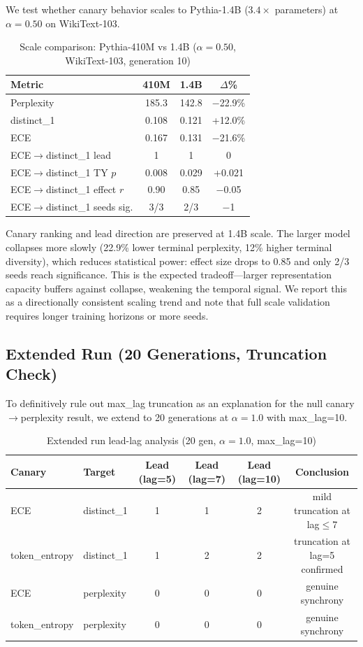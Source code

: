 \documentclass[letterpaper]{article}
\begin{document}
We test whether canary behavior scales to Pythia-1.4B ($3.4\times$ parameters) at $\alpha=0.50$ on WikiText-103.

\begin{table}[h]
\centering
\caption{Scale comparison: Pythia-410M vs 1.4B ($\alpha=0.50$, WikiText-103, generation 10)}
\label{tab:scale}
\begin{tabular}{lccc}
\toprule
Metric & 410M & 1.4B & $\Delta$\% \\
\midrule
Perplexity & 185.3 & 142.8 & $-$22.9\% \\
distinct\_1 & 0.108 & 0.121 & +12.0\% \\
ECE & 0.167 & 0.131 & $-$21.6\% \\
ECE$\to$distinct\_1 lead & 1 & 1 & 0 \\
ECE$\to$distinct\_1 TY $p$ & 0.008 & 0.029 & +0.021 \\
ECE$\to$distinct\_1 effect $r$ & 0.90 & 0.85 & $-$0.05 \\
ECE$\to$distinct\_1 seeds sig. & 3/3 & 2/3 & $-$1 \\
\bottomrule
\end{tabular}
\end{table}

Canary ranking and lead direction are preserved at 1.4B scale. The larger model collapses more slowly (22.9\% lower terminal perplexity, 12\% higher terminal diversity), which reduces statistical power: effect size drops to 0.85 and only 2/3 seeds reach significance. This is the expected tradeoff---larger representation capacity buffers against collapse, weakening the temporal signal. We report this as a directionally consistent scaling trend and note that full scale validation requires longer training horizons or more seeds.

\subsection{Extended Run (20 Generations, Truncation Check)}

To definitively rule out max\_lag truncation as an explanation for the null canary$\to$perplexity result, we extend to 20 generations at $\alpha=1.0$ with max\_lag=10.

\begin{table}[h]
\centering
\caption{Extended run lead-lag analysis (20 gen, $\alpha=1.0$, max\_lag=10)}
\label{tab:extended}
\begin{tabular}{llcccc}
\toprule
Canary & Target & Lead (lag=5) & Lead (lag=7) & Lead (lag=10) & Conclusion \\
\midrule
ECE & distinct\_1 & 1 & 1 & 2 & mild truncation at lag$\leq$7 \\
token\_entropy & distinct\_1 & 1 & 2 & 2 & truncation at lag=5 confirmed \\
ECE & perplexity & 0 & 0 & 0 & genuine synchrony \\
token\_entropy & perplexity & 0 & 0 & 0 & genuine synchrony \\
\bottomrule
\end{tabular}
\end{table}
\end{document}
